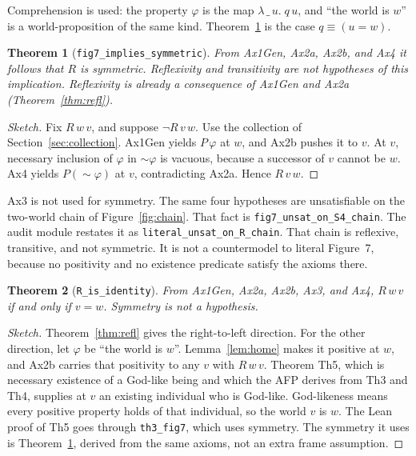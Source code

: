\documentclass[11pt,a4paper]{article}
\newcommand{\lean}[1]{\texttt{#1}}
\newtheorem{theorem}{Theorem}
\theoremstyle{definition}
\theoremstyle{remark}
\begin{document}
Comprehension is used: the property \(\varphi\) is the map
\(\lambda\,\_\,u.\; q\,u\), and ``the world is \(w\)'' is a world-proposition
of the same kind.
Theorem~\ref{thm:sym} is the case \(q \equiv (u = w)\).

\begin{theorem}[\lean{fig7\_implies\_symmetric}]
\label{thm:sym}
From Ax1Gen, Ax2a, Ax2b, and Ax4 it follows that \(R\) is symmetric.
Reflexivity and transitivity are not hypotheses of this implication.
Reflexivity is already a consequence of Ax1Gen and Ax2a
(Theorem~\ref{thm:refl}).
\end{theorem}

\begin{proof}[Sketch]
Fix \(R\,w\,v\), and suppose \(\neg R\,v\,w\).
Use the collection of Section~\ref{sec:collection}.
Ax1Gen yields \(P\,\varphi\) at \(w\), and Ax2b pushes it to \(v\).
At \(v\), necessary inclusion of \(\varphi\) in \(\sim\varphi\) is vacuous,
because a successor of \(v\) cannot be \(w\).
Ax4 yields \(P(\sim\varphi)\) at \(v\), contradicting Ax2a.
Hence \(R\,v\,w\).
\end{proof}

Ax3 is not used for symmetry.
The same four hypotheses are unsatisfiable on the two-world chain of
Figure~\ref{fig:chain}.
That fact is \lean{fig7\_unsat\_on\_S4\_chain}.
The audit module restates it as \lean{literal\_unsat\_on\_R\_chain}.
That chain is reflexive, transitive, and not symmetric.
It is not a countermodel to literal Figure~7, because no positivity and no
existence predicate satisfy the axioms there.

\begin{theorem}[\lean{R\_is\_identity}]
\label{thm:id}
From Ax1Gen, Ax2a, Ax2b, Ax3, and Ax4,
\(R\,w\,v\) if and only if \(v = w\).
Symmetry is not a hypothesis.
\end{theorem}

\begin{proof}[Sketch]
Theorem~\ref{thm:refl} gives the right-to-left direction.
For the other direction, let \(\varphi\) be ``the world is \(w\)''.
Lemma~\ref{lem:home} makes it positive at \(w\), and Ax2b carries that
positivity to any \(v\) with \(R\,w\,v\).
Theorem Th5, which is necessary existence of a God-like being and which the
AFP derives from Th3 and Th4, supplies at \(v\) an existing individual who is
God-like.
God-likeness means every positive property holds of that individual, so the
world \(v\) is \(w\).
The Lean proof of Th5 goes through \lean{th3\_fig7}, which uses symmetry.
The symmetry it uses is Theorem~\ref{thm:sym}, derived from the same axioms,
not an extra frame assumption.
\end{proof}
\end{document}
